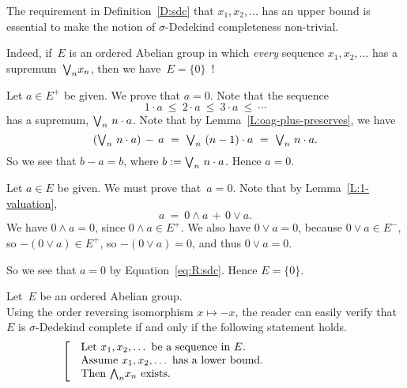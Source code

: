 \begin{rem}
The requirement
in Definition~\ref{D:sdc}
 that $x_1,x_2,\dotsc$
has an upper bound 
is essential
to make the notion
of $\sigma$-Dedekind completeness non-trivial.

Indeed,
if~$E$ is an ordered Abelian group
in which \emph{every} sequence $x_1,x_2,\dotsc$ has a supremum~$\textstyle{\bigvee}_n x_n$,
then we have~$E=\{0\}$~!

Let $a\in E^+$ be given. We prove that $a=0$.
Note that the sequence
\begin{equation*}
1\cdot a  \ \leq\ 2\cdot a \ \leq\  3\cdot a \ \leq\ \dotsb
\end{equation*}
has a supremum, $\textstyle{\bigvee}_n \ n\cdot a$.
Note that by Lemma~\ref{L:oag-plus-preserves}, we have
\begin{equation*}
(\bv_n\ n\cdot a)\,-\,a\ =\ 
\bv_n \ (n-1) \cdot a \ = \ 
\bv_n\ n\cdot a.
\end{equation*}
So we see that $b-a = b$,
where $b:= \textstyle{\bigvee}_n \ n\cdot a$.
Hence $a=0$.

Let $a\in E$ be given.
We must prove that~$a=0$.
Note that
by Lemma~\ref{L:1-valuation},
\begin{equation}
\label{eq:R:sdc}
a\ = \ 0\wedge a \,+\, 0\vee a.
\end{equation}
We have $0\wedge a =0$,
since $0\wedge a \in E^+$.
We also have $0\vee a=0$,
because $0\vee a\in E^-$,
so $-(0\vee a)\in E^+$, so $-(0\vee a)=0$,
and thus $0\vee a=0$.

So we see that $a=0$ by Equation~\eqref{eq:R:sdc}.
Hence $E=\{0\}$.
\end{rem}
%
%
\begin{rem}
\label{R:sdc}
Let~$E$ be an ordered Abelian group.\\
Using the order reversing isomorphism $x\mapsto -x$,
the reader can easily verify that
$E$ is $\sigma$-Dedekind complete
if and only if the following statement holds.
\begin{equation*}
\left[\quad
\begin{minipage}{.7\columnwidth}
Let $x_1,x_2,\dotsc$ be a sequence in~$E$.\\
Assume $x_1,x_2,\dotsc$ has a lower bound.\\
Then $\bw_n x_n$ exists.
\end{minipage}
\right.
\end{equation*}
\end{rem}
